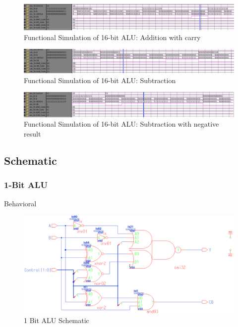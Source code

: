 \documentclass[11pt]{article}
\begin{document}
			\begin{figure}[H]
				\centering
				\includegraphics[width=0.7\linewidth]{"Pictures/16 Bit ALU Add Carry"}
				\caption{Functional Simulation of 16-bit ALU: Addition with carry}
				\label{fig:16-bit-alu-add-carry}
			\end{figure}
			
			
			\begin{figure}[H]
				\centering
				\includegraphics[width=0.7\linewidth]{"Pictures/16 Bit Alu Sub Pos"}
				\caption{Functional Simulation of 16-bit ALU: Subtraction}
				\label{fig:16-bit-alu-sub-pos}
			\end{figure}
			
			
			\begin{figure}[H]
				\centering
				\includegraphics[width=0.7\linewidth]{"Pictures/16 Bit ALU Sub Neg"}
				\caption{Functional Simulation of 16-bit ALU: Subtraction with negative result}
				\label{fig:16-bit-alu-sub-neg}
			\end{figure}

	\subsection{Schematic}

		\subsubsection{1-Bit ALU}	
		
			
			Behavioral
			
			\begin{figure}[H]
				\centering
				\includegraphics[width=0.4\linewidth]{"Pictures/ALU-1Bit Schematic"}
				\caption{1 Bit ALU Schematic}
				\label{fig:alu-1bit-schematic}
			\end{figure}
		
\end{document}
